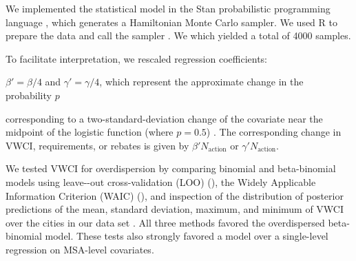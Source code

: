 \documentclass[draft,linenumbers]{agujournal}
\begin{document}
We implemented the statistical model in the Stan probabilistic programming
language \citep{carpenter:stan:2016}, which generates a Hamiltonian Monte Carlo
sampler.
We used R to prepare the data and call the sampler \citep{r.manual:2016}.
We
%
which yielded a total of 4000 samples.

To facilitate interpretation, we
%
rescaled regression coefficients:
\iffalse
$\beta' = N_{\text{action}} \beta / 4$ and $\gamma' = N_{\text{action}} \gamma / 4$,
which represent the approximate change in VWCI (or requirements or rebates)
\else
$\beta' = \beta / 4$ and $\gamma' = \gamma / 4$, which represent
the approximate change in the probability $p$
\fi
corresponding to a two-standard-deviation change of the covariate near the
midpoint of the logistic function (where $p = 0.5$)%
.
The corresponding change in VWCI, requirements, or rebates is given by
$\beta' N_{\text{action}}$ or $\gamma' N_{\text{action}}$.

We tested VWCI for overdispersion by comparing binomial and beta-binomial models
using leave--out cross-validation (LOO)
(),
the Widely Applicable Information Criterion (WAIC)
(),
and
inspection of the distribution of posterior predictions of the mean, standard
deviation, maximum, and minimum of VWCI over the cities in our data
set \citep{gelman:bda:2014,vehtari:loo:2016}.
All three methods favored the overdispersed beta-binomial model.
These tests also strongly favored a
model over a single-level regression on MSA-level covariates.
\end{document}
